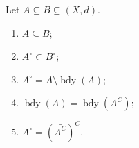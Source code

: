 \documentclass[notoc,notitlepage]{tufte-book}
\DeclareMathOperator{\bdy}{bdy }
\begin{document}
\begin{propo}\label{propo:mixing_the_notions}
  Let $A \subseteq B \subseteq (X, d)$.
  \begin{enumerate}
    \item $\bar{A} \subseteq \bar{B}$;
    \item $A^\circ \subset B^\circ$;
    \item $A^\circ = A \setminus \bdy(A)$;
    \item $\bdy(A) = \bdy(A^C)$;
    \item $A^\circ = {\left(\bar{A^C}\right)}^C$.
  \end{enumerate}
\end{propo}
\end{document}
